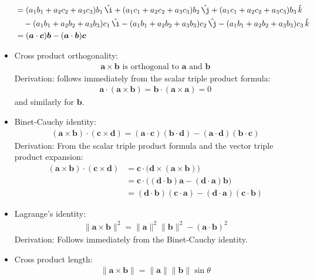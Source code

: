 \documentclass{article}
\renewcommand{\vec}[1]{\boldsymbol{#1}}
\newcommand{\unit}[1]{\,\hat{#1}}
\begin{document}
\begin{itemize}
\begin{align}
    &= (a_1 b_1 + a_2 c_2 + a_3 c_3) b_1 \unit{\i}
    + (a_1 c_1 + a_2 c_2 + a_3 c_3) b_2 \unit{\j}
    + (a_1 c_1 + a_2 c_2 + a_3 c_3) b_3 \unit{k} \\
    &\quad- (a_1 b_1 + a_2 b_2 + a_3 b_3) c_1 \unit{\i}
    - (a_1 b_1 + a_2 b_2 + a_3 b_3) c_2 \unit{\j}
    - (a_1 b_1 + a_2 b_2 + a_3 b_3) c_3 \unit{k} \\
    &= (\vec{a} \cdot \vec{c}) \vec{b} - (\vec{a} \cdot \vec{b}) \vec{c}
  \end{align}
\item Cross product orthogonality:
  \begin{align}
    \vec{a} \times \vec{b} \text{ is orthogonal to } \vec{a} \text{ and } \vec{b}
  \end{align}
  Derivation: follows immediately from the scalar triple product formula:
  \begin{align}
    \vec{a} \cdot (\vec{a} \times \vec{b})
    = \vec{b} \cdot (\vec{a} \times \vec{a}) = 0
  \end{align}
  and similarly for $\vec{b}$.
\item Binet-Cauchy identity:
  \begin{align}
    (\vec{a} \times \vec{b}) \cdot (\vec{c} \times \vec{d})
    = (\vec{a} \cdot \vec{c})(\vec{b} \cdot \vec{d})
    - (\vec{a} \cdot \vec{d})(\vec{b} \cdot \vec{c})
  \end{align}
  Derivation: From the scalar triple product formula and the vector
  triple product expansion:
  \begin{align}
    (\vec{a} \times \vec{b}) \cdot (\vec{c} \times \vec{d})
    &= \vec{c} \cdot \big( \vec{d} \times (\vec{a} \times \vec{b}) \big) \\
    &= \vec{c} \cdot \big( (\vec{d} \cdot \vec{b}) \vec{a}
    - (\vec{d} \cdot \vec{a}) \vec{b} \big) \\
    &= (\vec{d} \cdot \vec{b}) (\vec{c} \cdot \vec{a})
    - (\vec{d} \cdot \vec{a}) (\vec{c} \cdot \vec{b})
  \end{align}
\item Lagrange's identity:
  \begin{align}
    \| \vec{a} \times \vec{b} \|^2 = \|\vec{a}\|^2 \|\vec{b}\|^2 -
    (\vec{a} \cdot \vec{b})^2
  \end{align}
  Derivation: Follows immediately from the Binet-Cauchy identity.
\item Cross product length:
  \begin{align}
    \| \vec{a} \times \vec{b} \| = \|\vec{a}\| \|\vec{b}\| \sin\theta

\end{align}
\end{itemize}
\end{document}
